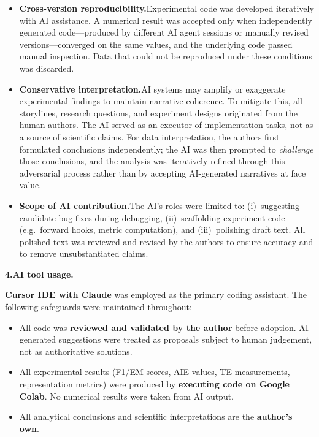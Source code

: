 \documentclass[10pt]{article}
\begin{document}
\vspace{0.4em}

\begin{itemize}[leftmargin=1.6em]
\item \textbf{Cross-version reproducibility.}\quad Experimental code was developed iteratively with AI assistance. A numerical result was accepted only when independently generated code---produced by different AI agent sessions or manually revised versions---converged on the same values, and the underlying code passed manual inspection. Data that could not be reproduced under these conditions was discarded.
\item \textbf{Conservative interpretation.}\quad AI systems may amplify or exaggerate experimental findings to maintain narrative coherence. To mitigate this, all storylines, research questions, and experiment designs originated from the human authors. The AI served as an executor of implementation tasks, not as a source of scientific claims. For data interpretation, the authors first formulated conclusions independently; the AI was then prompted to \emph{challenge} those conclusions, and the analysis was iteratively refined through this adversarial process rather than by accepting AI-generated narratives at face value.
\item \textbf{Scope of AI contribution.}\quad The AI's roles were limited to: (i)~suggesting candidate bug fixes during debugging, (ii)~scaffolding experiment code (e.g.\ forward hooks, metric computation), and (iii)~polishing draft text. All polished text was reviewed and revised by the authors to ensure accuracy and to remove unsubstantiated claims.
\end{itemize}

\vspace{0.8em}

\textbf{4.\quad AI tool usage.}

\vspace{0.4em}

\textbf{Cursor IDE with Claude} was employed as the primary coding assistant. The following safeguards were maintained throughout:

\begin{itemize}[leftmargin=1.6em]
\item All code was \textbf{reviewed and validated by the author} before adoption. AI-generated suggestions were treated as proposals subject to human judgement, not as authoritative solutions.
\item All experimental results (F1/EM scores, AIE values, TE measurements, representation metrics) were produced by \textbf{executing code on Google Colab}. No numerical results were taken from AI output.
\item All analytical conclusions and scientific interpretations are the \textbf{author's own}.
\end{itemize}
\end{document}
